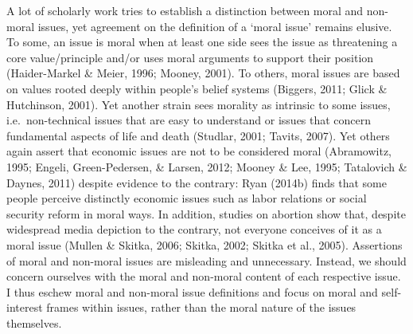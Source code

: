 \documentclass[12pt,econ]{sources/authesis}
\begin{document}
A lot of scholarly work tries to establish a distinction between moral and non-moral issues, yet agreement on the definition of a `moral issue' remains elusive. To some, an issue is moral when at least one side sees the issue as threatening a core value/principle and/or uses moral arguments to support their position (Haider-Markel \& Meier, 1996; Mooney, 2001). To others, moral issues are based on values rooted deeply within people's belief systems (Biggers, 2011; Glick \& Hutchinson, 2001). Yet another strain sees morality as intrinsic to some issues, i.e.~non-technical issues that are easy to understand or issues that concern fundamental aspects of life and death (Studlar, 2001; Tavits, 2007). Yet others again assert that economic issues are not to be considered moral (Abramowitz, 1995; Engeli, Green-Pedersen, \& Larsen, 2012; Mooney \& Lee, 1995; Tatalovich \& Daynes, 2011) despite evidence to the contrary: Ryan (2014b) finds that some people perceive distinctly economic issues such as labor relations or social security reform in moral ways. In addition, studies on abortion show that, despite widespread media depiction to the contrary, not everyone conceives of it as a moral issue (Mullen \& Skitka, 2006; Skitka, 2002; Skitka et al., 2005). Assertions of moral and non-moral issues are misleading and unnecessary. Instead, we should concern ourselves with the moral and non-moral content of each respective issue. I thus eschew moral and non-moral issue definitions and focus on moral and self-interest frames within issues, rather than the moral nature of the issues themselves.
\end{document}

